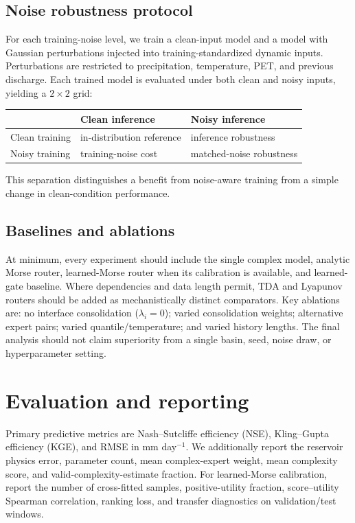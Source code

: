 \documentclass[11pt]{article}
\begin{document}
\subsection{Noise robustness protocol}
For each training-noise level, we train a clean-input model and a model with Gaussian perturbations injected into training-standardized dynamic inputs. Perturbations are restricted to precipitation, temperature, PET, and previous discharge. Each trained model is evaluated under both clean and noisy inputs, yielding a $2\times2$ grid:
\begin{center}
\begin{tabular}{lll}
\toprule
 & Clean inference & Noisy inference \\
\midrule
Clean training & in-distribution reference & inference robustness \\
Noisy training & training-noise cost & matched-noise robustness \\
\bottomrule
\end{tabular}
\end{center}
This separation distinguishes a benefit from noise-aware training from a simple change in clean-condition performance.

\subsection{Baselines and ablations}
At minimum, every experiment should include the single complex model, analytic Morse router, learned-Morse router when its calibration is available, and learned-gate baseline. Where dependencies and data length permit, TDA and Lyapunov routers should be added as mechanistically distinct comparators. Key ablations are: no interface consolidation ($\lambda_i=0$); varied consolidation weights; alternative expert pairs; varied quantile/temperature; and varied history lengths. The final analysis should not claim superiority from a single basin, seed, noise draw, or hyperparameter setting.

\section{Evaluation and reporting}
Primary predictive metrics are Nash--Sutcliffe efficiency (NSE), Kling--Gupta efficiency (KGE), and RMSE in mm day$^{-1}$. We additionally report the reservoir physics error, parameter count, mean complex-expert weight, mean complexity score, and valid-complexity-estimate fraction. For learned-Morse calibration, report the number of cross-fitted samples, positive-utility fraction, score--utility Spearman correlation, ranking loss, and transfer diagnostics on validation/test windows.
\end{document}
